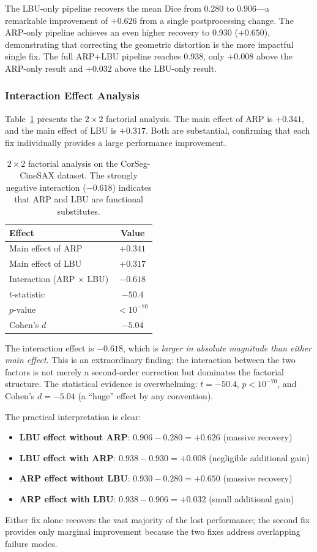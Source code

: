 \documentclass[10pt,twocolumn]{article}
\begin{document}
The LBU-only pipeline recovers the mean Dice from 0.280 to 0.906---a remarkable improvement of $+0.626$ from a single postprocessing change.
The ARP-only pipeline achieves an even higher recovery to 0.930 ($+0.650$), demonstrating that correcting the geometric distortion is the more impactful single fix.
The full ARP+LBU pipeline reaches 0.938, only $+0.008$ above the ARP-only result and $+0.032$ above the LBU-only result.

\subsubsection{Interaction Effect Analysis}

Table~\ref{tab:real_factorial} presents the $2\times2$ factorial analysis.
The main effect of ARP is $+0.341$, and the main effect of LBU is $+0.317$.
Both are substantial, confirming that each fix individually provides a large performance improvement.

\begin{table}[t]
\centering
\caption{$2\times2$ factorial analysis on the CorSeg-CineSAX dataset. The strongly negative interaction ($-0.618$) indicates that ARP and LBU are functional substitutes.}
\label{tab:real_factorial}
\begin{tabular}{lc}
\toprule
Effect & Value \\
\midrule
Main effect of ARP  & $+0.341$ \\
Main effect of LBU  & $+0.317$ \\
Interaction (ARP $\times$ LBU) & $-0.618$ \\
\midrule
$t$-statistic & $-50.4$ \\
$p$-value & $< 10^{-70}$ \\
Cohen's $d$ & $-5.04$ \\
\bottomrule
\end{tabular}
\end{table}

The interaction effect is $-0.618$, which is \emph{larger in absolute magnitude than either main effect}.
This is an extraordinary finding: the interaction between the two factors is not merely a second-order correction but dominates the factorial structure.
The statistical evidence is overwhelming: $t = -50.4$, $p < 10^{-70}$, and Cohen's $d = -5.04$ (a ``huge'' effect by any convention).

The practical interpretation is clear:
\begin{itemize}[leftmargin=*]
    \item \textbf{LBU effect without ARP}: $0.906 - 0.280 = +0.626$ (massive recovery)
    \item \textbf{LBU effect with ARP}: $0.938 - 0.930 = +0.008$ (negligible additional gain)
    \item \textbf{ARP effect without LBU}: $0.930 - 0.280 = +0.650$ (massive recovery)
    \item \textbf{ARP effect with LBU}: $0.938 - 0.906 = +0.032$ (small additional gain)
\end{itemize}
Either fix alone recovers the vast majority of the lost performance; the second fix provides only marginal improvement because the two fixes address overlapping failure modes.
\end{document}
